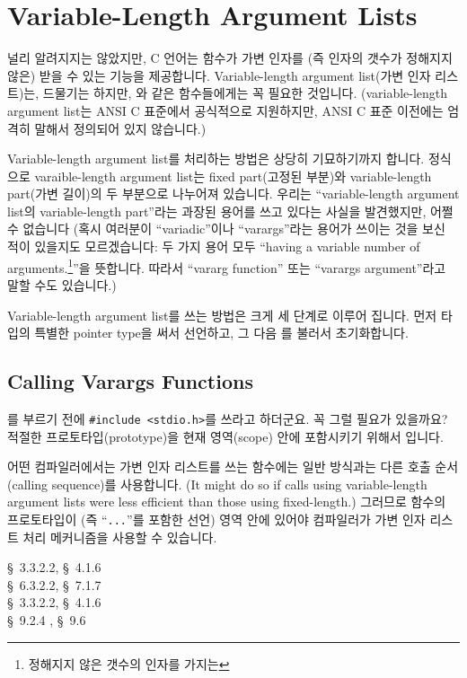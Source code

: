 \chapter{Variable-Length Argument Lists}	\label{chap:vlal}

널리 알려지지는 않았지만, C 언어는 함수가 가변 인자를 (즉 인자의 갯수가 
정해지지 않은) 받을 수 있는 기능을 제공합니다.
Variable-length argument list(가변 인자 리스트)는, 드물기는 하지만,
와 같은 함수들에게는 꼭 필요한 것입니다.
(variable-length argument list는 ANSI C 표준에서 공식적으로 지원하지만,
ANSI C 표준 이전에는 엄격히 말해서 정의되어 있지 않습니다.)

Variable-length argument list를 처리하는 방법은 상당히 기묘하기까지 합니다.
정식으로 varaible-length argument list는 fixed part(고정된 부분)와 
variable-length part(가변 길이)의
두 부분으로 나누어져 있습니다.  우리는 ``variable-length argument list의
variable-length part''라는 과장된 용어를 쓰고 있다는 사실을 발견했지만,
어쩔 수 없습니다 (혹시 여러분이 ``variadic''이나 ``varargs''라는 용어가
쓰이는 것을 보신 적이 있을지도 모르겠습니다: 두 가지 용어 모두
``having a variable number of arguments.\footnote{정해지지 않은 갯수의 인자를
가지는}''을 뜻합니다.  따라서 ``vararg function'' 또는 ``varargs argument''라고
말할 수도 있습니다.)

Variable-length argument list를 쓰는 방법은 크게 세 단계로 이루어 집니다.
먼저  타입의 특별한 pointer type을 써서 선언하고, 그 다음
를 불러서 초기화합니다.

\section{Calling Varargs Functions}

\begin{faq}
	를 부르기 전에 \verb+#include <stdio.h>+를 쓰라고
	하더군요.  꼭 그럴 필요가 있을까요?
\A
	적절한 프로토타입(prototype)을 현재 영역(scope) 안에 포함시키기
	위해서 입니다.

	어떤 컴파일러에서는 가변 인자 리스트를 쓰는 함수에는 일반 방식과는
	다른 호출 순서(calling sequence)를 사용합니다.
	(It might do so if calls using variable-length argument lists were
	less efficient than those using fixed-length.)
	그러므로 함수의 프로토타입이 (즉 ``\verb+...+''를 포함한 선언)
	영역 안에 있어야 컴파일러가 가변 인자 리스트 처리 메커니즘을
	사용할 수 있습니다.

\R
	\cite{ansi} \S\ 3.3.2.2, \S\ 4.1.6 \\
	\cite{c89} \S\ 6.3.2.2, \S\ 7.1.7 \\
	\cite{rationale} \S\ 3.3.2.2, \S\ 4.1.6 \\
	\cite{hs} \S\ 9.2.4 , \S\ 9.6 
\end{faq}


